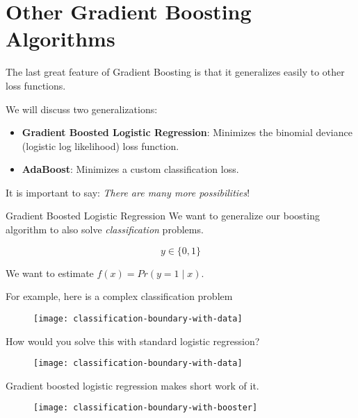 \section{Other Gradient Boosting Algorithms}

\begin{frame}
The last great feature of Gradient Boosting is that it generalizes easily to other loss functions.
\end{frame}
%
\begin{frame}
We will discuss two generalizations:

\begin{itemize}
  \item \textbf{Gradient Boosted Logistic Regression}: Minimizes the binomial deviance (logistic log likelihood) loss function.
  \item \textbf{AdaBoost}: Minimizes a custom classification loss.
\end{itemize}

It is important to say: \textit{There are many more possibilities}!
\end{frame}
%
\begin{frame}{Gradient Boosted Logistic Regression}
We want to generalize our boosting algorithm to also solve \textit{classification} problems. 

$$ y \in  \{0, 1\} $$

We want to estimate $ f(x) = Pr(y = 1 \mid x) $.
\end{frame}
%
\begin{frame}
For example, here is a complex classification problem

  \begin{figure}
    \texttt{[image: classification-boundary-with-data]}
  \end{figure}

\end{frame}
%
\begin{frame}
How would you solve this with standard logistic regression?

  \begin{figure}
    \texttt{[image: classification-boundary-with-data]}
  \end{figure}

\end{frame}
%
\begin{frame}
Gradient boosted logistic regression makes short work of it.

  \begin{figure}
    \texttt{[image: classification-boundary-with-booster]}
  \end{figure}

\end{frame}

